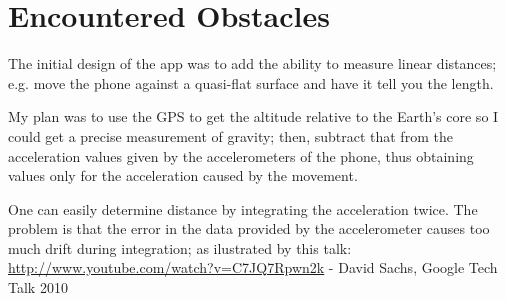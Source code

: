 \section{Encountered Obstacles}

The initial design of the app was to add the ability to measure linear distances; e.g. move the phone against a
quasi-flat surface and have it tell you the length.

My plan was to use the GPS to get the altitude relative to the Earth's core so I could get a precise measurement of
gravity; then, subtract that from the acceleration values given by the accelerometers of the phone, thus obtaining
values only for the acceleration caused by the movement.

One can easily determine distance by integrating the acceleration twice. The problem is that the error in the data
provided by the accelerometer causes too much drift during integration; as ilustrated by this talk:
 \url{http://www.youtube.com/watch?v=C7JQ7Rpwn2k} - David Sachs, Google Tech Talk 2010
